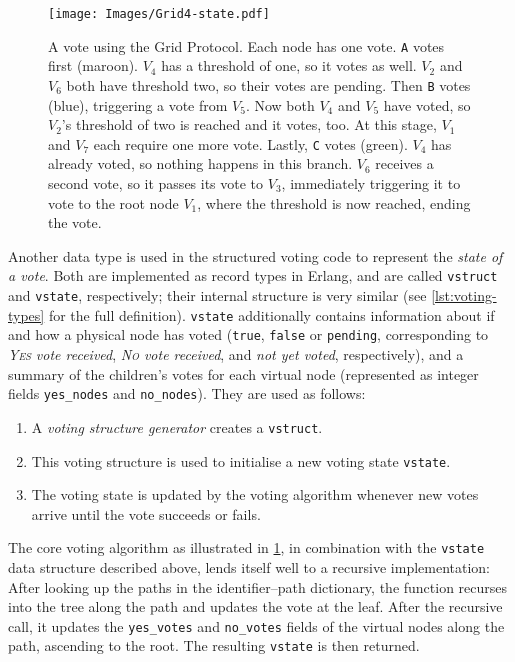 \documentclass[12pt,chapterprefix=true,toc=bibliography,numbers=noendperiod,
               footnotes=multiple,twoside]{scrreprt}
\newcommand{\yes}{{\fontfamily{jkposn}\selectfont\textsc{Yes}}}
\newcommand{\no}{{\fontfamily{jkposn}\selectfont\textsc{No}}}
\begin{document}
\begin{figure}[p]
    \centering
    \texttt{[image: Images/Grid4-state.pdf]}
    \caption[A vote using the Grid Protocol]{A vote using the Grid Protocol. Each node has one vote. \texttt{A} votes first (maroon). \(V_4\) has a threshold of one, so it votes as well. \(V_2\) and \(V_6\) both have threshold two, so their votes are pending. Then \texttt{B} votes (blue), triggering a vote from \(V_5\). Now both \(V_4\) and \(V_5\) have voted, so \(V_2\)'s threshold of two is reached and it votes, too. At this stage, \(V_1\) and \(V_7\) each require one more vote. Lastly, \texttt{C} votes (green). \(V_4\) has already voted, so nothing happens in this branch. \(V_6\) receives a second vote, so it passes its vote to \(V_3\), immediately triggering it to vote to the root node \(V_1\), where the threshold is now reached, ending the vote.}
    \label{fig:grid4-state}
\end{figure}

Another data type is used in the structured voting code to represent the \emph{state of a vote}. Both are implemented as record types in Erlang, and are called \texttt{vstruct} and \texttt{vstate}, respectively; their internal structure is very similar (see \cref{lst:voting-types} for the full definition). \texttt{vstate} additionally contains information about if and how a physical node has voted (\texttt{true}, \texttt{false} or \texttt{pending}, corresponding to \emph{\yes{} vote received}, \emph{\no{} vote received}, and \emph{not yet voted}, respectively), and a summary of the children's votes for each virtual node (represented as integer fields \texttt{yes\_nodes} and \texttt{no\_nodes}). They are used as follows:

\begin{enumerate}
    \item A \emph{voting structure generator} creates a \texttt{vstruct}.
    \item This voting structure is used to initialise a new voting state \texttt{vstate}.
    \item The voting state is updated by the voting algorithm whenever new votes arrive until the vote succeeds or fails.
\end{enumerate}

The core voting algorithm as illustrated in \cref{fig:grid4-state}, in combination with the \texttt{vstate} data structure described above, lends itself well to a recursive implementation: After looking up the paths in the identifier--path dictionary, the function recurses into the tree along the path and updates the vote at the leaf. After the recursive call, it updates the \texttt{yes\_votes} and \texttt{no\_votes} fields of the virtual nodes along the path, ascending to the root. The resulting \texttt{vstate} is then returned.
\end{document}
